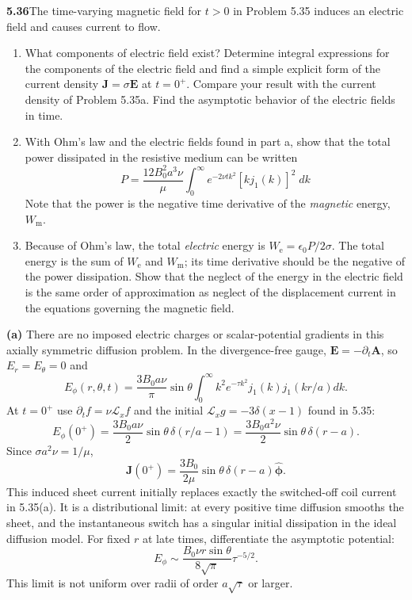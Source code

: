 \par\bigskip
\noindent\textbf{5.36}\quad The time-varying magnetic field for $t>0$ in Problem 5.35 induces an electric field and causes current to flow.
\begin{enumerate}
\item[(a)] What components of electric field exist? Determine integral expressions for the components of the electric field and find a simple explicit form of the current density $\mathbf{J}=\sigma\mathbf{E}$ at $t=0^{+}$. Compare your result with the current density of Problem 5.35a. Find the asymptotic behavior of the electric fields in time.
\item[(b)] With Ohm's law and the electric fields found in part a, show that the total power dissipated in the resistive medium can be written
\[
P=\frac{12B_{0}^{2}a^{3}\nu}{\mu}\int_{0}^{\infty}e^{-2\nu tk^{2}}[kj_{1}(k)]^{2}\;dk
\]
Note that the power is the negative time derivative of the \emph{magnetic} energy, $W_{\mathrm{m}}$.
\item[(c)] Because of Ohm's law, the total \emph{electric} energy is $W_{\mathrm{e}}=\epsilon_{0}P/2\sigma$. The total energy is the sum of $W_{\mathrm{e}}$ and $W_{\mathrm{m}}$; its time derivative should be the negative of the power dissipation. Show that the neglect of the energy in the electric field is the same order of approximation as neglect of the displacement current in the equations governing the magnetic field.
\end{enumerate}
\solution
\textbf{(a)} There are no imposed electric charges or scalar-potential
gradients in this axially symmetric diffusion problem. In the
divergence-free gauge,
$\mathbf E=-\partial_t\mathbf A$, so $E_r=E_\theta=0$ and
\[
\boxed{E_\phi(r,\theta,t)=\frac{3B_0a\nu}{\pi}\sin\theta
\int_0^\infty k^2e^{-\tau k^2}j_1(k)j_1(kr/a)dk.}
\]
At $t=0^+$ use $\partial_tf=\nu\mathcal L_xf$ and the initial
$\mathcal L_xg=-3\delta(x-1)$ found in 5.35:
\[
E_\phi(0^+)=\frac{3B_0a\nu}{2}\sin\theta\,\delta(r/a-1)
=\frac{3B_0a^2\nu}{2}\sin\theta\,\delta(r-a).
\]
Since $\sigma a^2\nu=1/\mu$,
\[
\boxed{\mathbf J(0^+)=\frac{3B_0}{2\mu}
\sin\theta\,\delta(r-a)\widehat{\boldsymbol\phi}.}
\]
This induced sheet current initially replaces exactly the switched-off
coil current in 5.35(a). It is a distributional limit: at every positive
time diffusion smooths the sheet, and the instantaneous switch has a
singular initial dissipation in the ideal diffusion model.
For fixed $r$ at late times, differentiate the asymptotic potential:
\[
\boxed{E_\phi\sim\frac{B_0\nu r\sin\theta}{8\sqrt\pi}\tau^{-5/2}.}
\]
This limit is not uniform over radii of order $a\sqrt\tau$ or larger.

